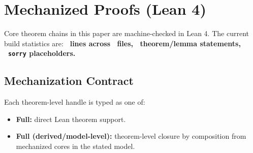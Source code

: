 \section*{Mechanized Proofs (Lean 4)}\label{sec:lean}

Core theorem chains in this paper are machine-checked in Lean 4. The current build statistics are:
\textbf{\LeanTotalLines\ lines across \LeanTotalFiles\ files, \LeanTotalTheorems\ theorem/lemma statements, \LeanTotalSorry\ \texttt{sorry} placeholders.}

\subsection*{Mechanization Contract}

Each theorem-level handle is typed as one of:
\begin{itemize}
\item \textbf{Full:} direct Lean theorem support.
\item \textbf{Full (derived/model-level):} theorem-level closure by composition from mechanized cores in the stated model.
\end{itemize}

